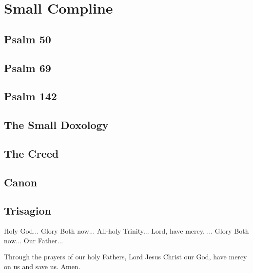 \section{Small Compline}



\subsection{Psalm 50}



\subsection{Psalm 69}



\subsection{Psalm 142}



\subsection{The Small Doxology}



\subsection{The Creed}



\subsection{Canon}




\subsection{Trisagion}

Holy God... Glory  Both now... All-holy Trinity... Lord, have mercy. ... Glory  Both now... Our Father...

Through the prayers of our holy Fathers, Lord Jesus Christ our God, have mercy on us and save us. Amen.


